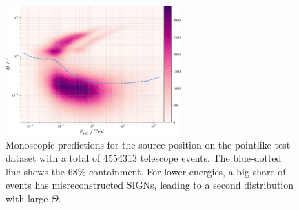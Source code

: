 
\begin{figure}
    \centering
    \captionsetup{width=0.9\linewidth}
    \includegraphics[width=0.6\textwidth]{../analysis/plots/gamma/tel_vs_energy.pdf}
    \caption{
        Monoscopic predictions for the source position on the pointlike 
        test dataset with a total of 4554313 telescope events.
        The blue-dotted line shows the 68\% containment. 
        For lower energies, a big share of events has misreconstructed SIGNs,
        leading to a second distribution with large $\Theta$.}
    \label{fig:sens_telescope_gamma}
\end{figure}


